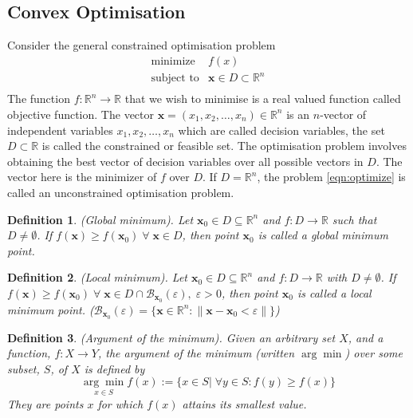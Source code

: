 \documentclass[12pt]{report}
\newtheorem{defn}{Definition}[section]
\numberwithin{equation}{section}
\begin{document}
\subsection{Convex Optimisation}
Consider the general {constrained} optimisation problem 
\begin{equation}\label{eqn:optimize}
\begin{array}{ll}
\text{minimize} & f(x)  \\
\text{subject to} & \bm{x} \in D \subset \mathbb{R}^n \\
\end{array}
\end{equation}
The function $f:\mathbb{R}^n \rightarrow \mathbb{R}$ that we wish to minimise is a real valued function called {objective function}. The vector $\bm{x}=(x_1,x_2,\hdots,x_n)\in \mathbb{R}^n$ is an $n$-vector of independent variables $x_1,x_2,\hdots,x_n$ which are called {decision variables}, the set $D \subset \mathbb{R}$ is called the {constrained or feasible set}. The optimisation problem involves obtaining the best vector of decision variables over all possible vectors in $D$. The vector here is the minimizer of $f$ over $D$. If $D=\mathbb{R}^n$, the problem \eqref{eqn:optimize} is called an {unconstrained} optimisation problem.
\begin{defn} 
\normalfont
(Global minimum).
Let $\bm{x}_0 \in D \subseteq \mathbb{R}^n$ and $f:D \rightarrow \mathbb{R}$ such that $D \neq \emptyset$. If $f(\bm{x}) \geq f(\bm{x}_0) \;  \forall \; \bm{x} \in D$, then point $\bm{x}_0$ is called a global minimum point.
\end{defn}
\begin{defn} 
\normalfont
(Local minimum).
Let $\bm{x}_0 \in D \subseteq \mathbb{R}^n$ and $f:D \rightarrow \mathbb{R}$ with $D \neq \emptyset$. If $f(\bm{x}) \geq f(\bm{x}_0) \;  \forall \; \bm{x} \in D \cap \mathcal{B}_{\bm{x}_0}(\varepsilon),\; \varepsilon>0$, then point $\bm{x}_0$ is called a local minimum point. ($\mathcal{B}_{\bm{x}_0}(\varepsilon) = \{ \bm{x} \in \mathbb{R}^n: \| \bm{x}-\bm{x}_0<\varepsilon\|\}$)
\end{defn}
\begin{defn} 
\normalfont
(Argument of the minimum).
Given an arbitrary set $X$,  and a function, $f\colon X\rightarrow Y$, the argument of the minimum (written $\arg\min$) over some subset, $S$, of $X$ is defined by
\[ \underset{x \in S}{\arg \min } f(x):=\{x \in S | \; \forall y \in S: f(y) \geq f(x)\}
\]
They are points $x$ for which $f(x)$ attains its smallest value. 
\end{defn}
\end{document}
